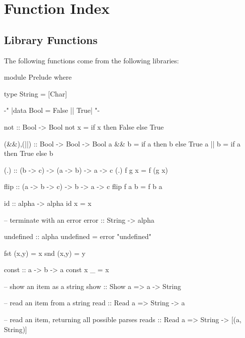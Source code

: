 
\chapter{Function Index}




\printindex


\section{Library Functions}

\begin{comment}
\begin{code}
import Prelude(Char,Show,Eq(..),Int,Num(..),Ord(..),otherwise,repeat,Read,Bool(..))
data IO a = IO a
instance Monad IO
\end{code}
\end{comment}


The following functions come from the following libraries:

\begin{code}
module Prelude where

type String = [Char]

{-" |data Bool = False || True| "-}

not :: Bool -> Bool
not x = if x then False else True

(&&),(||) :: Bool -> Bool -> Bool
a && b = if a then b else True
a || b = if a then True else b

(.) :: (b -> c) -> (a -> b) -> a -> c
(.) f g x = f (g x)

flip :: (a -> b -> c) -> b -> a -> c
flip f a b = f b a

id :: alpha -> alpha
id x = x

-- terminate with an error
error :: String -> alpha

undefined :: alpha
undefined = error "undefined"

fst (x,y) = x
snd (x,y) = y

const                   :: a -> b -> a
const x _               =  x

-- show an item as a string
show :: Show a => a -> String

-- read an item from a string
read :: Read a => String -> a

-- read an item, returning all possible parses
reads :: Read a => String -> [(a, String)]
\end{code}


